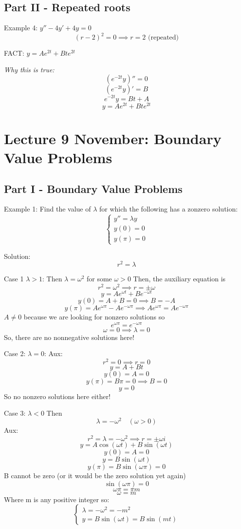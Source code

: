 \documentclass[12pt]{article}
\begin{document}
\subsection*{Part II - Repeated roots}
Example 4: $y'' - 4y' + 4y = 0$
\[(r - 2)^2 = 0 \implies r = 2 \text{ (repeated)}\]

FACT: $y = Ae^{2t} + Bte^{2t}$

\emph{Why this is true:} 
\[\left(e^{-2t} y\right)'' = 0\]
\[\left(e^{-2t} y \right)' = B\]
\[e^{-2t} y = Bt + A\]
\[y = Ae^{2t} + Bte^{2t}\]

\section{Lecture 9 November: Boundary Value Problems}
\subsection*{Part I - Boundary Value Problems}
Example 1: Find the value of $\lambda$ for which the following has a zonzero solution:
\[\begin{cases}
    y'' = \lambda y\\
    y(0) = 0\\
    y(\pi) = 0
\end{cases}\]

Solution:
\[r^2 = \lambda\]

Case 1 $\lambda > 1$: Then $\lambda = \omega^2$ for some $\omega > 0$
Then, the auxiliary equation is 
\[r^2 = \omega^2 \implies r = \pm \omega\]
\[y = Ae^{\omega t} + Be^{-\omega t}\]
\[y(0) = A + B = 0 \implies B = - A\]
\[y(\pi) = Ae^{\omega \pi} - Ae^{-\omega \pi} \implies Ae^{\omega \pi} = A e^{-\omega \pi}\]
$A \neq 0$ because we are looking for nonzero solutions so 
\[e^{\omega \pi} = e^{-\omega \pi}\]
\[\omega = 0 \implies \lambda = 0\]
So, there are no nonnegative solutions here!

Case 2: $\lambda = 0$: 
Aux: 
\[r^2 = 0 \implies r = 0\]
\[y = A + Bt\]
\[y(0) = A = 0\]
\[y(\pi) = B\pi = 0 \implies B = 0\]
\[y = 0\]
So no nonzero solutions here either!

Case 3: $\lambda < 0$
Then 
\[\lambda = -\omega^2 \quad (\omega > 0)\]
Aux:
\[r^2 = \lambda = -\omega^2 \implies r = \pm \omega i\]
\[y = A\cos (\omega t) + B \sin (\omega t)\]
\[y(0) = A = 0\]
\[y = B\sin (\omega t)\]
\[y(\pi) = B\sin (\omega \pi) = 0\]
B cannot be zero (or it would be the zero solution yet again)
\[\sin (\omega \pi) = 0\]
\[\omega \pi = \pi m\]
\[\omega = m\]
Where m is any positive integer so:
\[\begin{cases}
    \lambda = -\omega^2 = -m^2\\
    y = B \sin (\omega t) = B \sin(m t)
\end{cases}\]
\end{document}
